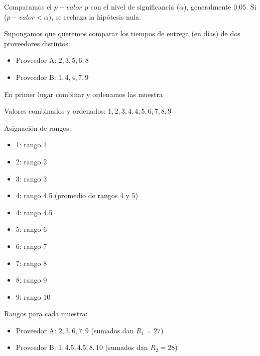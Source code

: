 \documentclass[
  letterpaper,
  DIV=11,
  numbers=noendperiod]{scrreprt}
\providecommand{\tightlist}{%
  \setlength{\itemsep}{0pt}\setlength{\parskip}{0pt}}\usepackage{longtable,booktabs,array}
\begin{document}
Comparamos el \(p-valor\) p con el nivel de significancia (\(\alpha\)),
generalmente \(0.05\). Si (\(p-valor < \alpha\)), se rechaza la
hipótesis nula.

\begin{tcolorbox}[enhanced jigsaw, arc=.35mm, breakable, coltitle=black, left=2mm, opacityback=0, bottomtitle=1mm, colbacktitle=quarto-callout-tip-color!10!white, title=\textcolor{quarto-callout-tip-color}{\faLightbulb}\hspace{0.5em}{Ejemplo Práctico. Prueba Mann-Whitney}, titlerule=0mm, colback=white, colframe=quarto-callout-tip-color-frame, bottomrule=.15mm, rightrule=.15mm, opacitybacktitle=0.6, toptitle=1mm, toprule=.15mm, leftrule=.75mm]

Supongamos que queremos comparar los tiempos de entrega (en días) de dos
proveedores distintos:

\begin{itemize}
\tightlist
\item
  Proveedor A: \(2, 3, 5, 6, 8\)
\item
  Proveedor B: \(1, 4, 4, 7, 9\)
\end{itemize}

En primer lugar combinar y ordenamos las muestra

Valores combinados y ordenados: \(1, 2, 3, 4, 4, 5, 6, 7, 8, 9\)

Asignación de rangos:

\begin{itemize}
\tightlist
\item
  1: rango 1
\item
  2: rango 2
\item
  3: rango 3
\item
  4: rango 4.5 (promedio de rangos 4 y 5)
\item
  4: rango 4.5
\item
  5: rango 6
\item
  6: rango 7
\item
  7: rango 8
\item
  8: rango 9
\item
  9: rango 10
\end{itemize}

Rangos para cada muestra:

\begin{itemize}
\tightlist
\item
  Proveedor A: \(2, 3, 6, 7, 9\) (sumados dan \(R_1 = 27\))
\item
  Proveedor B: \(1, 4.5, 4.5, 8, 10\) (sumados dan \(R_2 = 28\))
\end{itemize}


\end{tcolorbox}
\end{document}
